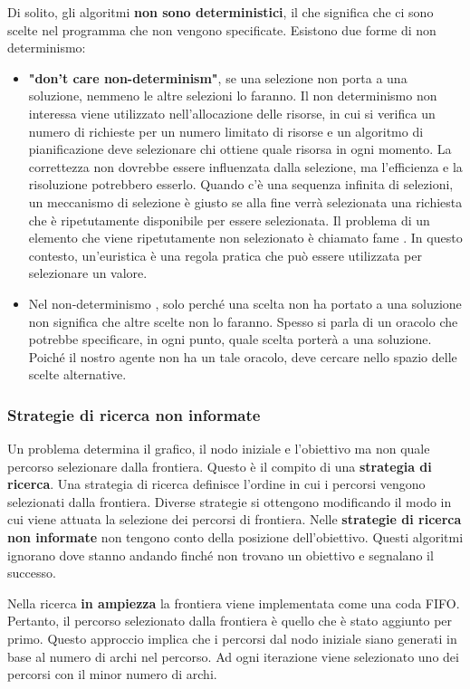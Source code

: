\documentclass[a4paper]{extarticle}
\begin{document}
Di solito, gli algoritmi \textbf{non sono deterministici}, il che significa che ci sono scelte nel programma che non vengono specificate. Esistono due forme di non determinismo:
\begin{itemize}
\item \textbf{"don't care non-determinism"}, se una selezione non porta a una soluzione, nemmeno le altre selezioni lo faranno. Il non determinismo non interessa viene utilizzato nell'allocazione delle risorse, in cui si verifica un numero di richieste per un numero limitato di risorse e un algoritmo di pianificazione deve selezionare chi ottiene quale risorsa in ogni momento. La correttezza non dovrebbe essere influenzata dalla selezione, ma l'efficienza e la risoluzione potrebbero esserlo. Quando c'è una sequenza infinita di selezioni, un meccanismo di selezione è giusto se alla fine verrà selezionata una richiesta che è ripetutamente disponibile per essere selezionata. Il problema di un elemento che viene ripetutamente non selezionato è chiamato fame . In questo contesto, un'euristica è una regola pratica che può essere utilizzata per selezionare un valore.
\item Nel non-determinismo , solo perché una scelta non ha portato a una soluzione non significa che altre scelte non lo faranno. Spesso si parla di un oracolo che potrebbe specificare, in ogni punto, quale scelta porterà a una soluzione. Poiché il nostro agente non ha un tale oracolo, deve cercare nello spazio delle scelte alternative.
\end{itemize}

\subsubsection{Strategie di ricerca non informate}

Un problema determina il grafico, il nodo iniziale e l'obiettivo ma non quale percorso selezionare dalla frontiera. Questo è il compito di una \textbf{strategia di ricerca}. Una strategia di ricerca definisce l'ordine in cui i percorsi vengono selezionati dalla frontiera. Diverse strategie si ottengono modificando il modo in cui viene attuata la selezione dei percorsi di frontiera. Nelle \textbf{strategie di ricerca non informate} non tengono conto della posizione dell'obiettivo. Questi algoritmi ignorano dove stanno andando finché non trovano un obiettivo e segnalano il successo.

Nella ricerca \textbf{in ampiezza} la frontiera viene implementata come una coda FIFO. Pertanto, il percorso selezionato dalla frontiera è quello che è stato aggiunto per primo. Questo approccio implica che i percorsi dal nodo iniziale siano generati in base al numero di archi nel percorso. Ad ogni iterazione viene selezionato uno dei percorsi con il minor numero di archi.
\end{document}
